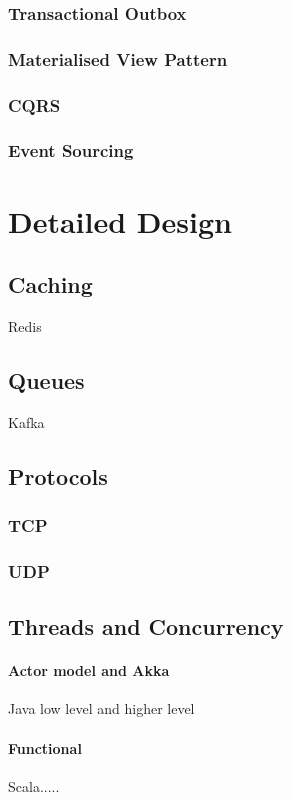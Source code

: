 \documentclass[a4paper, 11pt]{book}
\begin{document}
    \subsubsection{Transactional Outbox}
    \subsubsection{Materialised View Pattern}
    \subsubsection{CQRS}
    \subsubsection{Event Sourcing}

    \section{Detailed Design}
    \lipsum[5]

    \subsection{Caching}
    Redis
    \subsection{Queues}
    Kafka
    \subsection{Protocols}
    \subsubsection{TCP}
    \subsubsection{UDP}
    \subsection{Threads and Concurrency}
    \paragraph{Actor model and Akka}
    Java low level and higher level
    \paragraph{Functional}
    Scala.....
\end{document}
